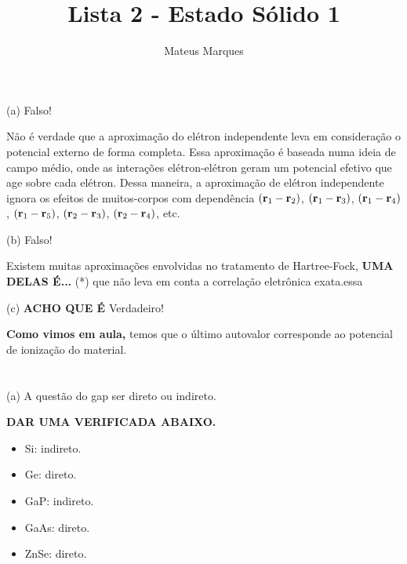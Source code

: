 \documentclass[a4paper,10pt]{article}
\title{\Huge{\textbf{Lista 2 - Estado Sólido 1}}}
\author{Mateus Marques}
\begin{document}
\maketitle

\section{}

(a) Falso!

\n

Não é verdade que a aproximação do elétron independente leva em consideração o potencial externo de forma completa. Essa aproximação é baseada numa ideia de campo médio, onde as interações elétron-elétron geram um potencial efetivo que age sobre cada elétron. Dessa maneira, a aproximação de elétron independente ignora os efeitos de muitos-corpos com dependência $({\vb{r}}_1 - {\vb{r}}_2)$, $({\vb{r}}_1 - {\vb{r}}_3)$, $({\vb{r}}_1 - {\vb{r}}_4)$,  $({\vb{r}}_1 - {\vb{r}}_5)$, $({\vb{r}}_2 - {\vb{r}}_3)$, $({\vb{r}}_2 - {\vb{r}}_4)$, etc.

\n\n

(b) Falso!

\n

Existem muitas aproximações envolvidas no tratamento de Hartree-Fock, \textbf{UMA DELAS É...} (*) que não leva em conta a correlação eletrônica exata.essa

\n\n

(c) \textbf{ACHO QUE É} Verdadeiro!

\n

\textbf{Como vimos em aula,} temos que o último autovalor corresponde ao potencial de ionização do material.

\n\n

\section{}

(a) A questão do gap ser direto ou indireto.

\textbf{DAR UMA VERIFICADA ABAIXO.}

\begin{itemize}
\item Si: indireto.
\item Ge: direto.
\item GaP: indireto.
\item GaAs: direto.
\item ZnSe: direto.
\end{itemize}

\n\n
\end{document}
